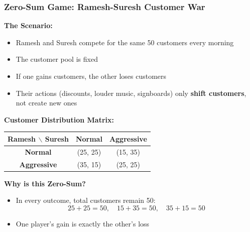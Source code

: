 \begin{frame}[fragile]\frametitle{Zero-Sum Game: Ramesh-Suresh Customer War}

\textbf{The Scenario:}
\begin{itemize}
  \item Ramesh and Suresh compete for the same 50 customers every morning
  \item The customer pool is fixed
  \item If one gains customers, the other loses customers
  \item Their actions (discounts, louder music, signboards) only \textbf{shift customers}, not create new ones
\end{itemize}

\vspace{6pt}

\textbf{Customer Distribution Matrix:}

\begin{center}
\begin{tabular}{|c|c|c|}
  \hline
  \textbf{Ramesh $\backslash$ Suresh} & \textbf{Normal} & \textbf{Aggressive} \\
  \hline
  \textbf{Normal} & (25, 25) & (15, 35) \\
  \hline
  \textbf{Aggressive} & (35, 15) & (25, 25) \\
  \hline
\end{tabular}
\end{center}

\vspace{6pt}

\textbf{Why is this Zero-Sum?}
\begin{itemize}
  \item In every outcome, total customers remain 50:
  \[
  25+25=50,\quad 15+35=50,\quad 35+15=50
  \]
  \item One player's gain is exactly the other's loss
\end{itemize}

\end{frame}

